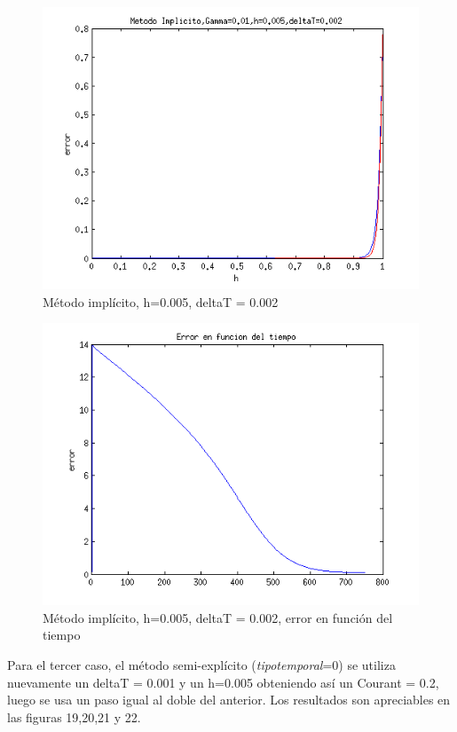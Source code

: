 \documentclass[11pt]{article}
\begin{document}
\begin{figure}[tbh]
	\centering
		\includegraphics[width=1.0\textwidth]{imagen17.png}
	\caption{M\'etodo impl\'icito, h=0.005, deltaT = 0.002}
	\label{fig:Fig1}
\end{figure}

\begin{figure}[tbh]
	\centering
		\includegraphics[width=1.0\textwidth]{imagen18.png}
	\caption{M\'etodo impl\'icito, h=0.005, deltaT = 0.002, error en funci\'on del tiempo}
	\label{fig:Fig1}
\end{figure}

\bigskip Para el tercer caso, el m\'etodo semi-expl\'icito (\textit{tipotemporal}=0) se utiliza nuevamente un deltaT = 0.001 y un h=0.005 obteniendo as\'i un Courant = 0.2, luego se usa un paso igual al doble del anterior. Los resultados son apreciables en las figuras 19,20,21 y 22.
\end{document}
